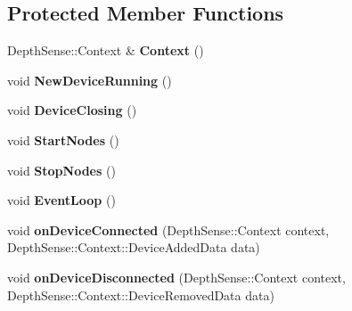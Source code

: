 \subsection*{Protected Member Functions}
\begin{DoxyCompactItemize}
\item 
Depth\+Sense\+::\+Context \& {\bfseries Context} ()\hypertarget{classpangolin_1_1_depth_sense_context_a922d781bcc0827080ab1b9986ed5229d}{}\label{classpangolin_1_1_depth_sense_context_a922d781bcc0827080ab1b9986ed5229d}

\item 
void {\bfseries New\+Device\+Running} ()\hypertarget{classpangolin_1_1_depth_sense_context_abe6593ca96e87b0a2b48fadd2b6166c4}{}\label{classpangolin_1_1_depth_sense_context_abe6593ca96e87b0a2b48fadd2b6166c4}

\item 
void {\bfseries Device\+Closing} ()\hypertarget{classpangolin_1_1_depth_sense_context_a6d11676ede6775280bf1ba708c167335}{}\label{classpangolin_1_1_depth_sense_context_a6d11676ede6775280bf1ba708c167335}

\item 
void {\bfseries Start\+Nodes} ()\hypertarget{classpangolin_1_1_depth_sense_context_af55aed48a6799102a2cb3ab65e804c7f}{}\label{classpangolin_1_1_depth_sense_context_af55aed48a6799102a2cb3ab65e804c7f}

\item 
void {\bfseries Stop\+Nodes} ()\hypertarget{classpangolin_1_1_depth_sense_context_a59b4cf2bf6192902f77c7268b923a7cd}{}\label{classpangolin_1_1_depth_sense_context_a59b4cf2bf6192902f77c7268b923a7cd}

\item 
void {\bfseries Event\+Loop} ()\hypertarget{classpangolin_1_1_depth_sense_context_aa4db3ae2ec465cf2b281c5c2438ca165}{}\label{classpangolin_1_1_depth_sense_context_aa4db3ae2ec465cf2b281c5c2438ca165}

\item 
void {\bfseries on\+Device\+Connected} (Depth\+Sense\+::\+Context context, Depth\+Sense\+::\+Context\+::\+Device\+Added\+Data data)\hypertarget{classpangolin_1_1_depth_sense_context_ad66efd6cd90d1f4d7feefdfac4eb98a9}{}\label{classpangolin_1_1_depth_sense_context_ad66efd6cd90d1f4d7feefdfac4eb98a9}

\item 
void {\bfseries on\+Device\+Disconnected} (Depth\+Sense\+::\+Context context, Depth\+Sense\+::\+Context\+::\+Device\+Removed\+Data data)\hypertarget{classpangolin_1_1_depth_sense_context_a874bcbb9a30a658d548e499883384f9d}{}\label{classpangolin_1_1_depth_sense_context_a874bcbb9a30a658d548e499883384f9d}

\end{DoxyCompactItemize}
